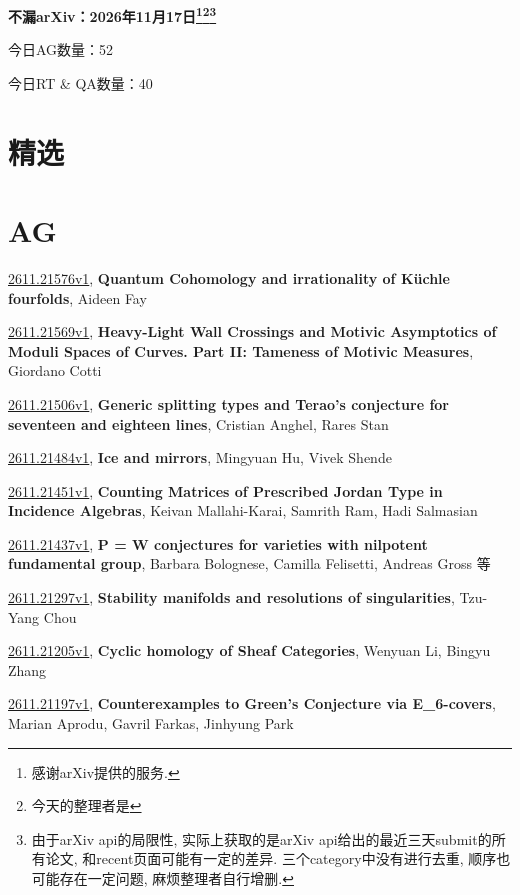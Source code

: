 \documentclass[9pt, a4paper]{article}
\theoremstyle{plain}
\theoremstyle{definition}
\theoremstyle{remark}
\newcommand{\arxiv}[3]{\href{https://arxiv.org/abs/#1}{#1}, \textbf{\textcolor{arxivblue}{#2}}, #3}
\newcommand{\AGnumber}{52}
\newcommand{\RTQAnumber}{40}
\newcommand{\NewestDate}{2026年11月17日}
\newcommand{\todayarXiver}{} %
\begin{document}
\begin{center}
    \Huge\textbf{不漏arXiv：\NewestDate\footnote{感谢arXiv提供的服务.}\footnote{今天的整理者是\todayarXiver}\footnote{由于arXiv api的局限性, 实际上获取的是arXiv api给出的最近三天submit的所有论文, 和recent页面可能有一定的差异. 三个category中没有进行去重, 顺序也可能存在一定问题, 麻烦整理者自行增删.}} \\
\end{center}

\setcounter{section}{-1}

\begin{center}
    今日AG数量：\AGnumber
    
    今日RT \& QA数量：\RTQAnumber
    
\end{center}


\section{精选}


\section{AG}
\arxiv{2611.21576v1}{Quantum Cohomology and irrationality of Küchle fourfolds}{Aideen Fay}

\arxiv{2611.21569v1}{Heavy-Light Wall Crossings and Motivic Asymptotics of Moduli Spaces of Curves. Part II: Tameness of Motivic Measures}{Giordano Cotti}

\arxiv{2611.21506v1}{Generic splitting types and Terao's conjecture for seventeen and eighteen lines}{Cristian Anghel, Rares Stan}

\arxiv{2611.21484v1}{Ice and mirrors}{Mingyuan Hu, Vivek Shende}

\arxiv{2611.21451v1}{Counting Matrices of Prescribed Jordan Type in Incidence Algebras}{Keivan Mallahi-Karai, Samrith Ram, Hadi Salmasian}

\arxiv{2611.21437v1}{P = W conjectures for varieties with nilpotent fundamental group}{Barbara Bolognese, Camilla Felisetti, Andreas Gross 等}

\arxiv{2611.21297v1}{Stability manifolds and resolutions of singularities}{Tzu-Yang Chou}

\arxiv{2611.21205v1}{Cyclic homology of Sheaf Categories}{Wenyuan Li, Bingyu Zhang}

\arxiv{2611.21197v1}{Counterexamples to Green's Conjecture via E_6-covers}{Marian Aprodu, Gavril Farkas, Jinhyung Park}
\end{document}

